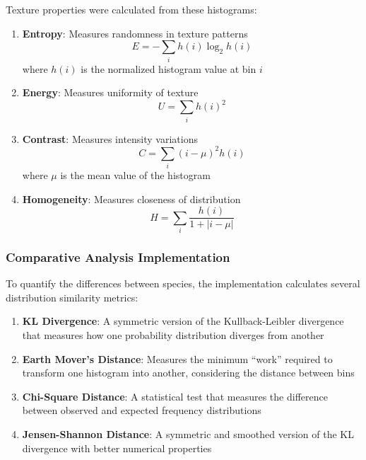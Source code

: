 \documentclass[a4paper,12pt]{report}
\begin{document}
Texture properties were calculated from these histograms:

\begin{enumerate}
    \item \textbf{Entropy}: Measures randomness in texture patterns
    \begin{equation}
    E = -\sum_{i} h(i) \log_2 h(i)
    \end{equation}
    where $h(i)$ is the normalized histogram value at bin $i$
    
    \item \textbf{Energy}: Measures uniformity of texture
    \begin{equation}
    U = \sum_{i} h(i)^2
    \end{equation}
    
    \item \textbf{Contrast}: Measures intensity variations
    \begin{equation}
    C = \sum_{i} (i - \mu)^2 h(i)
    \end{equation}
    where $\mu$ is the mean value of the histogram
    
    \item \textbf{Homogeneity}: Measures closeness of distribution
    \begin{equation}
    H = \sum_{i} \frac{h(i)}{1 + |i - \mu|}
    \end{equation}
\end{enumerate}


\subsubsection{Comparative Analysis Implementation}

To quantify the differences between species, the implementation calculates several distribution similarity metrics:

\begin{enumerate}
    \item \textbf{KL Divergence}: A symmetric version of the Kullback-Leibler divergence that measures how one probability distribution diverges from another

    \item \textbf{Earth Mover's Distance}: Measures the minimum ``work'' required to transform one histogram into another, considering the distance between bins

    \item \textbf{Chi-Square Distance}: A statistical test that measures the difference between observed and expected frequency distributions

    \item \textbf{Jensen-Shannon Distance}: A symmetric and smoothed version of the KL divergence with better numerical properties
\end{enumerate}
\end{document}
